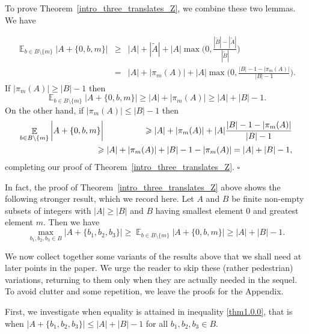 \documentclass[12pt,reqno]{amsart}
\DeclareMathOperator*{\E}{\mathbb{E}}
\theoremstyle{definition}
\renewcommand\leq{\leqslant}
\renewcommand\geq{\geqslant}
\begin{document}
\vspace{5pt}
To prove Theorem~\ref{intro_three_translates_Z}, we combine these two lemmas. We have

\begin{eqnarray*}
\E_{b \in B\setminus \{m\}} \bigg|A
+\{0,b,m\}\bigg|&\geq&|A|+|\widetilde{A}| +|A| \max\bigg(0,\frac{|\widetilde{B}| - |\widetilde{A}|}{|\widetilde{B}|}\bigg)\\
&=&|A|+|\pi_m(A)|+|A|\max\bigg(0, \frac{|B|-1-|\pi_m(A)|}{|B|-1} \bigg).
\end{eqnarray*}
If $|\pi_m(A)| \geq |B|-1$ then
\begin{equation*}
    \E_{b\in B \setminus \{m\}}\bigg|A+\{0,b,m\}\bigg| \geq |A|+|\pi_m(A)|
    \geq |A|+|B|-1.
\end{equation*}
On the other hand, if $|\pi_m(A)| \leq |B|-1$ then
\begin{eqnarray*}
    \E_{b\in B \setminus \{m\}}\bigg|A+\{0,b,m\}\bigg| \hspace{-17pt} &&\geq |A|+|\pi_m(A)|+ |A|\frac{|B|-1-|\pi_m(A)|}{|B|-1}\\
    \hspace{-17pt}&&\geq |A|+|\pi_m(A)|+|B|-1-|\pi_m(A)|
    =|A|+|B|-1,
\end{eqnarray*}
completing our proof of Theorem~\ref{intro_three_translates_Z}. \hfill{$\square$}


\vspace{5pt}
In fact, the proof of Theorem~\ref{intro_three_translates_Z} above shows the following stronger result, which we record here. Let $A$ and $B$ be finite non-empty subsets of integers with $|A|\geq |B|$ and $B$ having smallest element $0$ and greatest element $m$.  Then we have
\begin{equation}\label{thm1.0.0}
     \max_{b_1,b_2,b_3 \in B}\bigg|A+\{b_1,b_2,b_3\}\bigg| \geq \E_{b\in B\setminus \{m\}} \bigg| A +\{0,b,m\} \bigg| \geq |A|+|B|-1.
\end{equation}

\vspace{7pt}
We now collect together some variants of the results above that we shall need at later points in the paper. We urge the reader to skip these (rather pedestrian) variations, returning to them only when they are actually needed in the sequel. To avoid clutter and some repetition, we leave the proofs for the Appendix.

First, we investigate when equality is attained in inequality \eqref{thm1.0.0}, that is when $|A+\{b_1,b_2,b_3\}| \leq |A|+|B|-1$ for all $b_1,b_2,b_3 \in B$.
\end{document}
